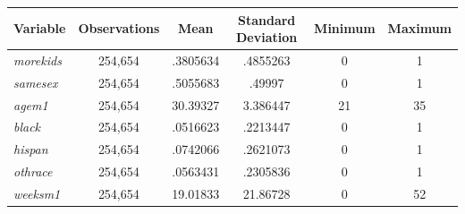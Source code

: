 \documentclass{article}
\begin{document}
\begin{center}
\begin{table}[hb!]
\centering

\begin{tabular}{|l|c|c|c|c|c|}
\hline
\multicolumn{1}{|c|}{\textbf{Variable}} & \textbf{Observations} & \textbf{Mean} & \textbf{Standard Deviation} & \textbf{Minimum} & \textbf{Maximum} \\ \hline
\textit{morekids}                       & 254,654               & .3805634      & .4855263                    & 0                & 1                \\ \hline
\textit{samesex}                        & 254,654               & .5055683      & .49997                      & 0                & 1                \\ \hline
\textit{agem1}                          & 254,654               & 30.39327      & 3.386447                    & 21               & 35               \\ \hline
\textit{black}                          & 254,654               & .0516623      & .2213447                    & 0                & 1                \\ \hline
\textit{hispan}                         & 254,654               & .0742066      & .2621073                    & 0                & 1                \\ \hline
\textit{othrace}                        & 254,654               & .0563431      & .2305836                    & 0                & 1                \\ \hline
\textit{weeksm1}                        & 254,654               & 19.01833      & 21.86728                    & 0                & 52               \\ \hline
\end{tabular}
\end{table}
\end{center}

\end{document}
